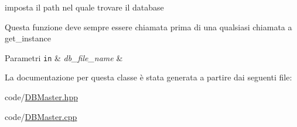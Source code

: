 imposta il path nel quale trovare il database 

Questa funzione deve sempre essere chiamata prima di una qualsiasi chiamata a get\+\_\+instance 
\begin{DoxyParams}[1]{Parametri}
\mbox{\tt in}  & {\em db\+\_\+file\+\_\+name} & \\
\hline
\end{DoxyParams}


La documentazione per questa classe è stata generata a partire dai seguenti file\+:\begin{DoxyCompactItemize}
\item 
code/\mbox{\hyperlink{_d_b_master_8hpp}{D\+B\+Master.\+hpp}}\item 
code/\mbox{\hyperlink{_d_b_master_8cpp}{D\+B\+Master.\+cpp}}\end{DoxyCompactItemize}
